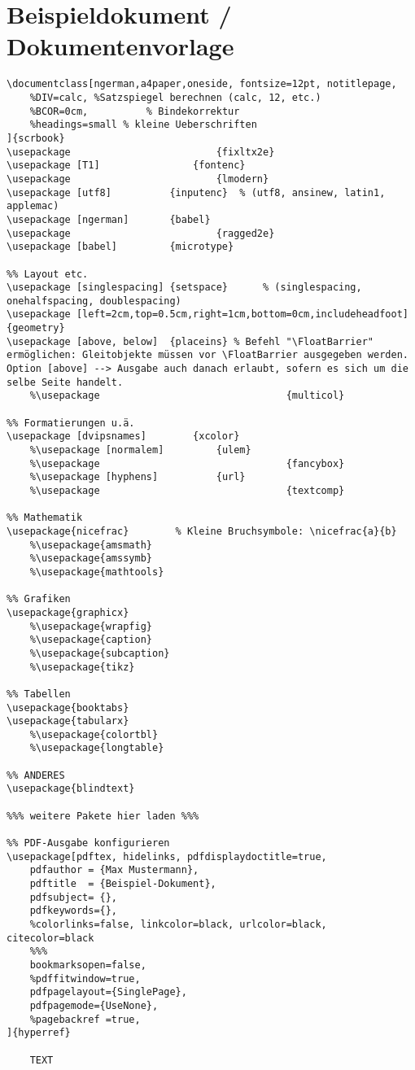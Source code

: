 \section{Beispieldokument / Dokumentenvorlage}
\negAbstand
%
\begin{multicols}{2}
\begin{lstlisting}
\documentclass[ngerman,a4paper,oneside, fontsize=12pt, notitlepage,
	%DIV=calc, %Satzspiegel berechnen (calc, 12, etc.)
	%BCOR=0cm,			% Bindekorrektur
	%headings=small	% kleine Ueberschriften
]{scrbook}
\usepackage 						{fixltx2e} 	
\usepackage [T1] 				{fontenc} 
\usepackage 						{lmodern}
\usepackage [utf8] 			{inputenc}	% (utf8, ansinew, latin1, applemac)
\usepackage [ngerman]		{babel}	
\usepackage 						{ragged2e}	
\usepackage [babel]			{microtype}

%% Layout etc.
\usepackage [singlespacing]	{setspace}		% (singlespacing, onehalfspacing, doublespacing)
\usepackage [left=2cm,top=0.5cm,right=1cm,bottom=0cm,includeheadfoot]	{geometry}
\usepackage [above, below]	{placeins} % Befehl "\FloatBarrier" ermöglichen: Gleitobjekte müssen vor \FloatBarrier ausgegeben werden. Option [above] --> Ausgabe auch danach erlaubt, sofern es sich um die selbe Seite handelt.
	%\usepackage								{multicol}

%% Formatierungen u.ä.
\usepackage [dvipsnames]		{xcolor}
	%\usepackage [normalem]			{ulem}
	%\usepackage								{fancybox}
	%\usepackage [hyphens]			{url}
	%\usepackage								{textcomp}

%% Mathematik
\usepackage{nicefrac}		 % Kleine Bruchsymbole: \nicefrac{a}{b}
	%\usepackage{amsmath}		
	%\usepackage{amssymb} 		
	%\usepackage{mathtools}	

%% Grafiken
\usepackage{graphicx}	
	%\usepackage{wrapfig}
	%\usepackage{caption}
	%\usepackage{subcaption}
	%\usepackage{tikz}

%% Tabellen
\usepackage{booktabs}
\usepackage{tabularx}
	%\usepackage{colortbl}
	%\usepackage{longtable}

%% ANDERES
\usepackage{blindtext} 

%%% weitere Pakete hier laden %%%

%% PDF-Ausgabe konfigurieren
\usepackage[pdftex,	hidelinks, pdfdisplaydoctitle=true,
	pdfauthor = {Max Mustermann},
	pdftitle  = {Beispiel-Dokument},
	pdfsubject= {},
	pdfkeywords={},
	%colorlinks=false, linkcolor=black, urlcolor=black, citecolor=black
	%%%
	bookmarksopen=false,
	%pdffitwindow=true,
	pdfpagelayout={SinglePage},
	pdfpagemode={UseNone}, 
	%pagebackref =true, 
]{hyperref}

	TEXT

\end{lstlisting}

\end{multicols}

